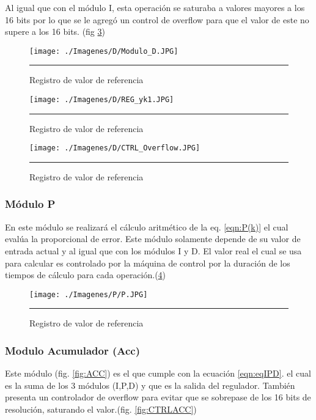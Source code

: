 \documentclass[12pt,a4paper]{article} %
\begin{document}
Al igual que con el módulo I, esta operación se saturaba a valores mayores a los 16 bits por lo que se le agregó un control de overflow para que el valor de este no supere a los 16 bits. (fig \ref{fig:overf})

\begin{figure}[htbp]
  \centering
    \texttt{[image: ./Imagenes/D/Modulo\_D.JPG]}
    \rule{35em}{0.3pt}
  \caption[D]{Registro de valor de referencia}
  \label{fig:D}
\end{figure}

\begin{figure}[htbp]
  \centering
    \texttt{[image: ./Imagenes/D/REG\_yk1.JPG]}
    \rule{35em}{0.3pt}
  \caption[yk1]{Registro de valor de referencia}
  \label{fig:yk1}
\end{figure}

\begin{figure}[htbp]
  \centering
    \texttt{[image: ./Imagenes/D/CTRL\_Overflow.JPG]}
    \rule{35em}{0.3pt}
  \caption[overf]{Registro de valor de referencia}
  \label{fig:overf}
\end{figure}

\subsubsection{Módulo P}

En este módulo se realizará el cálculo aritmético de la eq. \ref{eqn:P(k)} el cual evalúa la proporcional de error. Este módulo solamente depende de su valor de entrada actual y al igual que con los módulos I y D. El valor real el cual se usa para calcular es controlado por la máquina de control por la duración de los tiempos de cálculo para cada operación.(\ref{fig:P})

\begin{figure}[htbp]
  \centering
    \texttt{[image: ./Imagenes/P/P.JPG]}
    \rule{35em}{0.3pt}
  \caption[rebot]{Registro de valor de referencia}
  \label{fig:P}
\end{figure}

\subsubsection{Modulo Acumulador (Acc)}

Este módulo (fig. \ref{fig:ACC}) es el que cumple con la ecuación \ref{eqn:eqIPD}. el cual es la suma de los 3 módulos (I,P,D) y que es la salida del regulador. También presenta un controlador de overflow para evitar que se sobrepase de los 16 bits de resolución, saturando el valor.(fig. \ref{fig:CTRLACC})
\end{document}
